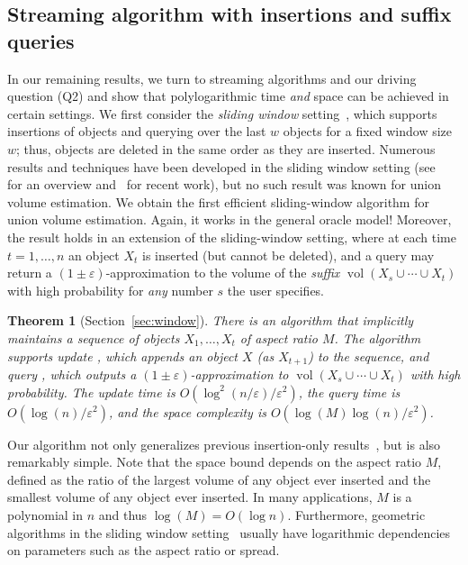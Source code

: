 \documentclass[11pt]{article}
\def\vol{\operatorname{vol}}		%
\newtheorem{theorem}{Theorem}[section]
\newcommand{\eps}{\varepsilon}
\begin{document}
\subsection{Streaming algorithm with insertions and suffix queries}
%
In our remaining results, we turn to streaming algorithms and our driving question (Q2) and show that polylogarithmic time \emph{and} space can be achieved in certain settings. 
We first consider the \emph{sliding window} setting~\cite{datar2002maintaining}, which supports insertions of objects and querying over the last $w$ objects for a fixed window size $w$;
thus, objects are deleted in the same order as they are inserted. Numerous results and techniques have been developed in the sliding window setting (see~\cite{muthukrishnan2005data,babcock2002models,Braverman16} for an overview and~\cite{woodruff2022tight,JayaramWZ22,FengSW25} for recent work), but no such result was known for union volume estimation.
%
We obtain the first efficient sliding-window algorithm for union volume estimation. Again, it
works in the general oracle model! Moreover, the result holds in an extension of the sliding-window setting, where at each time $t = 1, \dots, n$ an object $X_t$ is inserted (but cannot be deleted), and a query  may return a $(1\pm\eps)$-approximation to the volume of the \emph{suffix} $\vol(X_s \cup \cdots \cup X_t)$ with high probability for \emph{any} number $s$ the user specifies. 
%
\begin{theorem}[Section~\ref{sec:window}]
\label{thm:windowalgo}%
There is an algorithm that implicitly maintains a sequence of objects $X_1, \dots, X_t$ of aspect ratio $M$. The algorithm supports update , which appends an object $X$ (as $X_{t+1}$) to the sequence, and query , which outputs a $(1\pm\eps)$-approximation to $\vol(X_s \cup \cdots \cup X_t)$ with high probability. The update time is $O(\log^2(n/\eps)/\eps^2)$, the query time is $O(\log(n)/\eps^2)$, and the space complexity is $O(\log(M) \log(n)/\eps^2)$.
\end{theorem}
%
Our algorithm not only generalizes previous insertion-only results~\cite{MVC21}, but is also remarkably simple. Note that the space bound depends on the aspect ratio $M$, defined as the ratio of the largest volume of any object ever inserted and the smallest volume of any object ever inserted. In many applications, $M$ is a polynomial in $n$ and thus $\log(M) = O(\log n)$. Furthermore, geometric algorithms in the sliding window setting~\cite{FeigenbaumKZ04,ChanS06} usually have logarithmic dependencies on parameters such as the aspect ratio or spread.
%
\end{document}
